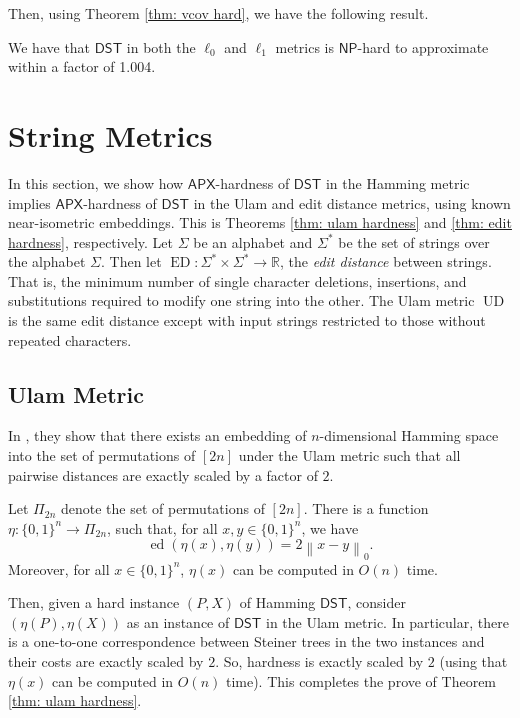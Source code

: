 \documentclass{theoretics}
\DeclareMathOperator{\ED}{ED}
\DeclareMathOperator{\UD}{UD}
\DeclareMathOperator{\ed}{ed}
\newcommand{\R}{\mathbb{R}}
\newcommand{\1}{\textbf{1}}
\newcommand{\norm}[1]{\left\lVert#1\right\rVert}
\newcommand{\dst}{$\mathsf{DST}$\xspace}
\newcommand{\np}{$\mathsf{NP}$\xspace}
\newcommand{\apx}{$\mathsf{APX}$\xspace}
\begin{document}
Then, using Theorem \ref{thm: vcov hard}, we have the following result.

\begin{theorem}
We have that  \dst in both the $\ell_0$ and $\ell_1$ metrics is \np-hard to approximate within a factor of 1.004.
\end{theorem}




\section{String Metrics} \label{sec: string metrics}
In this section, we show how \apx-hardness of \dst in the Hamming metric implies \apx-hardness of \dst in the Ulam and edit distance metrics, using known near-isometric embeddings. This is Theorems \ref{thm: ulam hardness} and \ref{thm: edit hardness}, respectively. Let $\Sigma$ be an alphabet and $\Sigma^*$ be the set of strings over the alphabet $\Sigma$. Then let $\ED : \Sigma^* \times \Sigma^* \to \R$, the \textit{edit distance} between strings. That is, the minimum number of single character deletions, insertions, and substitutions required to modify one string into the other. The Ulam metric $\UD$ is the same edit distance except with input strings restricted to those without repeated characters.

\subsection{Ulam Metric}
In \cite{DBLP:journals/corr/abs-2112-03222}, they show that there exists an embedding of $n$-dimensional Hamming space into the set of permutations of $[2n]$ under the Ulam metric such that all pairwise distances are exactly scaled by a factor of $2$.

\begin{lemma}
Let $\Pi_{2n}$ denote the set of permutations of $[2n]$. There is a function $\eta: \{0,1\}^n \to \Pi_{2n}$, such that, for all $x, y \in \{0,1\}^n$, we have
\[
\ed(\eta(x), \eta(y)) = 2 \norm{x - y}_0.
\]
Moreover, for all $x \in \{0,1\}^n$, $\eta(x)$ can be computed in $O(n)$ time.
\end{lemma}

Then, given a hard instance $(P, X)$ of Hamming \dst, consider $(\eta(P), \eta(X))$ as an instance of \dst in the Ulam metric. In particular, there is a one-to-one correspondence between Steiner trees in the two instances and their costs are exactly scaled by $2$. So, hardness is exactly scaled by $2$ (using that $\eta(x)$ can be computed in $O(n)$ time). This completes the prove of Theorem \ref{thm: ulam hardness}.
\end{document}
